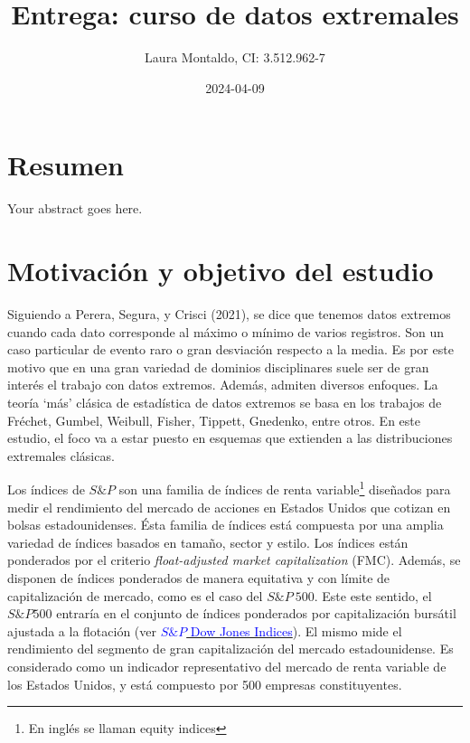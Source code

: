 \documentclass[
  oneside]{article}
\title{Entrega: curso de datos extremales}
\author{Laura Montaldo, CI: 3.512.962-7}
\date{2024-04-09}
\begin{document}
\maketitle

\newtheorem{theorem}{Teorema}

\newpage

\thispagestyle{empty}

\maketitle

\newpage

\tableofcontents

\newpage

\hypertarget{resumen}{%
\section{Resumen}\label{resumen}}

Your abstract goes here.

\newpage

\section{Motivación y objetivo del estudio}

Siguiendo a Perera, Segura, y Crisci (2021), se dice que tenemos datos
extremos cuando cada dato corresponde al máximo o mínimo de varios
registros. Son un caso particular de evento raro o gran desviación
respecto a la media. Es por este motivo que en una gran variedad de
dominios disciplinares suele ser de gran interés el trabajo con datos
extremos. Además, admiten diversos enfoques. La teoría `más' clásica de
estadística de datos extremos se basa en los trabajos de Fréchet,
Gumbel, Weibull, Fisher, Tippett, Gnedenko, entre otros. En este
estudio, el foco va a estar puesto en esquemas que extienden a las
distribuciones extremales clásicas.

Los índices de \(S\&P\) son una familia de índices de renta
variable\footnote{En inglés se llaman equity indices} diseñados para
medir el rendimiento del mercado de acciones en Estados Unidos que
cotizan en bolsas estadounidenses. Ésta familia de índices está
compuesta por una amplia variedad de índices basados en tamaño, sector y
estilo. Los índices están ponderados por el criterio
\textit{float-adjusted market capitalization} (FMC). Además, se disponen
de índices ponderados de manera equitativa y con límite de
capitalización de mercado, como es el caso del \(S\&P\:500\). Este este
sentido, el \(S\&P 500\) entraría en el conjunto de índices ponderados
por capitalización bursátil ajustada a la flotación (ver
\href{http://www.overleaf.com}{\textcolor{blue}{$S\&P$ Dow Jones Indices}}).
El mismo mide el rendimiento del segmento de gran capitalización del
mercado estadounidense. Es considerado como un indicador representativo
del mercado de renta variable de los Estados Unidos, y está compuesto
por 500 empresas constituyentes.
\end{document}
